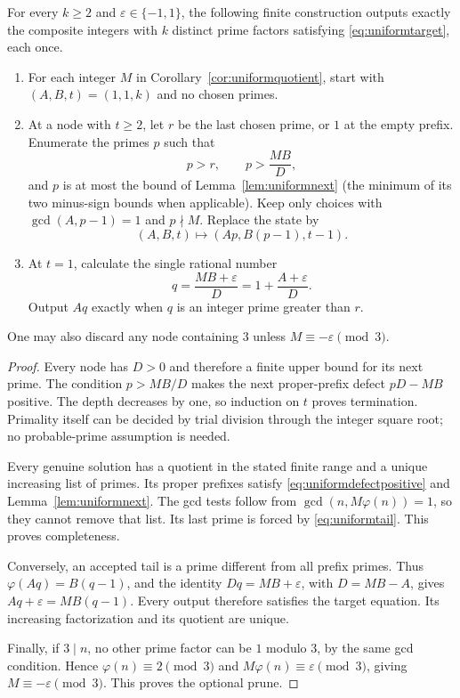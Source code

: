 \begin{theorem}\label{thm:uniformtree}
For every $k\ge2$ and $\varepsilon\in\{-1,1\}$, the following finite
construction outputs exactly the composite integers with $k$ distinct
prime factors satisfying \eqref{eq:uniformtarget}, each once.
\begin{enumerate}[label=\textup{(\roman*)}]
\item For each integer $M$ in Corollary~\ref{cor:uniformquotient}, start
with $(A,B,t)=(1,1,k)$ and no chosen primes.
\item At a node with $t\ge2$, let $r$ be the last chosen prime, or $1$
at the empty prefix. Enumerate the primes $p$ such that
\[
 p>r,\qquad p>\frac{MB}{D},
\]
and $p$ is at most the bound of Lemma~\ref{lem:uniformnext} (the minimum
of its two minus-sign bounds when applicable). Keep only choices with
$\gcd(A,p-1)=1$ and $p\nmid M$. Replace the state by
\[
 (A,B,t)\longmapsto(Ap,B(p-1),t-1).
\]
\item At $t=1$, calculate the single rational number
\begin{equation}\label{eq:uniformtail}
 q=\frac{MB+\varepsilon}{D}
   =1+\frac{A+\varepsilon}{D}.
\end{equation}
Output $Aq$ exactly when $q$ is an integer prime greater than $r$.
\end{enumerate}
One may also discard any node containing $3$ unless
$M\equiv-\varepsilon\pmod3$.
\end{theorem}

\begin{proof}
Every node has $D>0$ and therefore a finite upper bound for its next
prime. The condition $p>MB/D$ makes the next proper-prefix defect
$pD-MB$ positive. The depth decreases by one, so induction on $t$
proves termination. Primality itself can be decided by trial division
through the integer square root; no probable-prime assumption is needed.

Every genuine solution has a quotient in the stated finite range and a
unique increasing list of primes. Its proper prefixes satisfy
\eqref{eq:uniformdefectpositive} and Lemma~\ref{lem:uniformnext}.
The gcd tests follow from $\gcd(n,M\varphi(n))=1$, so they cannot remove
that list. Its last prime is forced by \eqref{eq:uniformtail}. This
proves completeness.

Conversely, an accepted tail is a prime different from all prefix
primes. Thus $\varphi(Aq)=B(q-1)$, and the identity
$Dq=MB+\varepsilon$, with $D=MB-A$, gives
$Aq+\varepsilon=MB(q-1)$. Every output therefore satisfies the target
equation. Its increasing factorization and its quotient are unique.

Finally, if $3\mid n$, no other prime factor can be $1$ modulo $3$,
by the same gcd condition. Hence $\varphi(n)\equiv2\pmod3$ and
$M\varphi(n)\equiv\varepsilon\pmod3$, giving
$M\equiv-\varepsilon\pmod3$. This proves the optional prune.
\end{proof}

